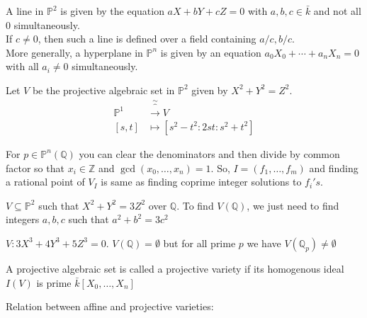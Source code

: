 \documentclass[oneside, 12pt]{scrbook}
\newcommand{\QQ}{\mathbb Q}
\newcommand{\ZZ}{\mathbb Z}
\theoremstyle{theorem}
\begin{document}
\begin{example}
A line in $\mathbb{P}^2$ is given by the equation $aX + bY + cZ=0$ with $a,b,c \in \bar{k}$ and not all $0$ simultaneously. \\
If $c\neq 0$, then such a line is defined over a field containing $a/c, b/c$. \\
More generally, a hyperplane in $\mathbb{P}^n$ is given by an equation $a_{0}X_{0} + \cdots + a_{n}X_{n} = 0$ with all $a_{i} \neq 0$ simultaneously.
\end{example}

\begin{example}
Let $V$ be the projective algebraic set in $\mathbb{P}^2$ given by $X^2 + Y^2 = Z^2$. 
\begin{align*}
\mathbb{P}^1 & \overbrace{\rightarrow}^{\sim} V \\
[s,t] & \mapsto [s^2 - t^2 : 2st : s^2+t^2]
\end{align*}
\end{example}

\begin{remark}
For $p \in \mathbb{P}^n(\QQ)$ you can clear the denominators and then divide by common factor so that $x_{i} \in \ZZ$ and $\gcd(x_{0} , \hdots ,x_{n})=1$. So, $I =(f_{1}, \hdots , f_{m})$ and finding a rational point of $V_{I}$ is same as finding coprime integer solutions to $f_{i}'s$. 
\end{remark}

\begin{example}
$V \subseteq \mathbb{P}^2$ such that $X^2 + Y^2 = 3Z^2$ over $\QQ$. To find $V(\QQ)$, we just need to find integers $a,b,c$ such that $a^2 +b^2 = 3c^2$
\end{example}

\begin{example}
$V : 3X^3 + 4Y^3 + 5Z^3 = 0$. $V(\QQ) = \emptyset$ but for all prime $p$ we have $V(\QQ_{p}) \neq \emptyset$
\end{example}

\begin{definition}
A projective algebraic set is called a projective variety if its homogenous ideal $I(V)$ is prime $\bar{k}[X_{0}, \hdots , X_{n}]$
\end{definition}

Relation between affine and projective varieties: \\
\end{document}
